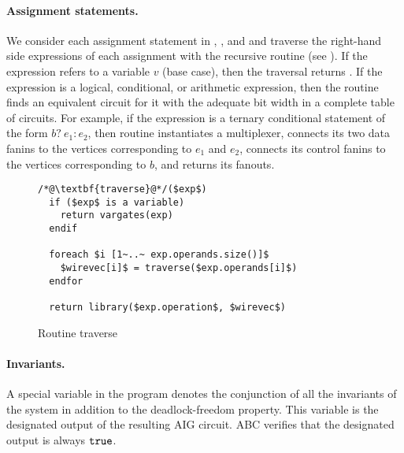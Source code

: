 \paragraph{Assignment statements.}
We consider each assignment statement in , ,
and  and traverse the right-hand side expressions of
each assignment with the recursive  routine (see ).
%
If the expression refers to a variable $v$ (base case), 
then the traversal returns . 
%
If the expression is a logical, conditional, or arithmetic expression, then
the  routine finds an equivalent circuit for it with the adequate bit
width in a complete table of circuits.
For example, if the expression is a ternary conditional statement of the
form $b?~e_1:e_2$, then routine  instantiates a multiplexer, 
connects its two data fanins to the vertices corresponding to $e_1$ and $e_2$, connects its control fanins to the vertices corresponding to $b$,
and returns its fanouts. 
%
\begin{figure}
\begin{lstlisting}
/*@\textbf{traverse}@*/($exp$)
  if ($exp$ is a variable) 
    return vargates(exp)
  endif

  foreach $i [1~..~ exp.operands.size()]$ 
    $wirevec[i]$ = traverse($exp.operands[i]$) 
  endfor

  return library($exp.operation$, $wirevec$)
\end{lstlisting}
\caption{Routine traverse}
\label{fig:traverse-listing}
\end{figure}
%
%
%

\paragraph{Invariants.}
%
A special variable in the \caig program denotes the conjunction of all the invariants of the system in addition to the deadlock-freedom property. This variable is the designated output of the resulting 
AIG circuit. ABC verifies that the designated output is always $\mathtt{true}$. 
%

